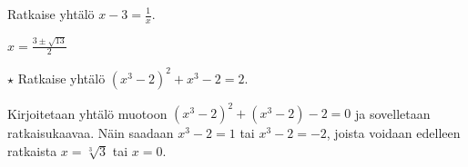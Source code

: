 \begin{tehtavasivu}
\begin{tehtava} %
Ratkaise yhtälö $x - 3 = \frac{1}{x}$.
    \begin{vastaus}
    $x =\frac{3 \pm \sqrt{13}}{2}$
    \end{vastaus}
\end{tehtava}

\begin{tehtava}
	$\star$ Ratkaise yhtälö $(x^3-2)^2+x^3-2=2$.
	\begin{vastaus}
		Kirjoitetaan yhtälö muotoon $(x^3-2)^2+(x^3-2)-2=0$ ja sovelletaan ratkaisukaavaa.
		Näin saadaan $x^3-2=1$ tai $x^3-2=-2$, joista voidaan edelleen ratkaista $x=\sqrt[3]{3}$ tai $x=0$.
	\end{vastaus}
\end{tehtava}

\end{tehtavasivu}
